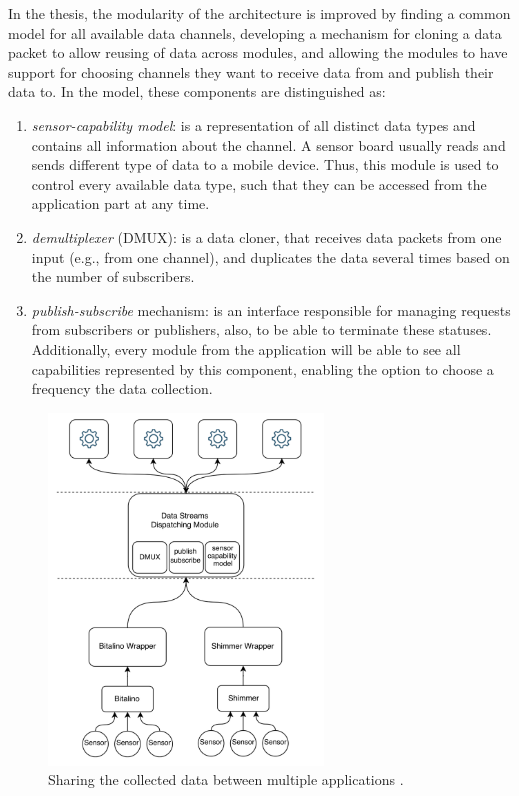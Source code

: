 In the thesis, the modularity of the architecture is improved by finding a common model for all available data channels, developing a mechanism for cloning a data packet to allow reusing of data across modules, and allowing the modules to have support for choosing channels they want to receive data from and publish their data to. In the model, these components are distinguished as: 
\begin{enumerate}
    \item \textit{sensor-capability model}: is a representation of all distinct data types and contains all information about the channel. A sensor board usually reads and sends different type of data to a mobile device. Thus, this module is used to control every available data type, such that they can be accessed from the application part at any time.
    \item \textit{demultiplexer} (DMUX): is a data cloner, that receives data packets from one input (e.g., from one channel), and duplicates the data several times based on the number of subscribers.
    \item \textit{publish-subscribe} mechanism: is an interface responsible for managing requests from subscribers or publishers, also, to be able to terminate these statuses. Additionally, every module from the application will be able to see all capabilities represented by this component, enabling the option to choose a frequency the data collection.
\end{enumerate}

\begin{figure}
    \centering
    \includegraphics[width=0.65\textwidth]{images/demux.png}
    \caption{Sharing the collected data between multiple applications \cite{daniel}.}
    \label{fig:demux}
\end{figure}

